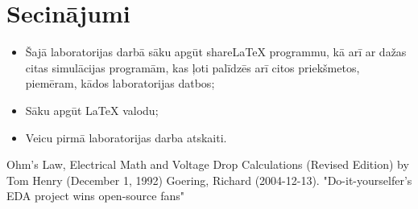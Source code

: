 \documentclass{report}
\begin{document}
\begin{figure}[b!]
\centering
{}
\label{att:5}
\end{figure}




\chapter{Secinājumi}
\begin{itemize}
\item Šajā laboratorijas darbā sāku apgūt shareLaTeX programmu, kā arī ar dažas citas simulācijas programām, kas ļoti palīdzēs arī citos priekšmetos, piemēram, kādos laboratorijas datbos;
\item Sāku apgūt LaTeX valodu;
\item Veicu pirmā laboratorijas darba atskaiti.
\end{itemize}

\begin{thebibliography}{1}
Ohm's Law, Electrical Math and Voltage Drop Calculations (Revised Edition) by Tom Henry (December 1, 1992)
 Goering, Richard (2004-12-13). "Do-it-yourselfer's EDA project wins open-source fans"
\end{thebibliography}
\end{document}
